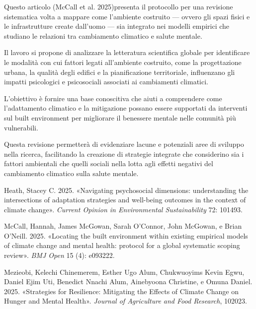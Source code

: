 \documentclass[
]{article}
\newlength{\cslhangindent}
\newenvironment{CSLReferences}[2] %
 {\begin{list}{}{%
  \setlength{\itemindent}{0pt}
  \setlength{\leftmargin}{0pt}
  \setlength{\parsep}{0pt}
  \ifodd #1
   \setlength{\leftmargin}{\cslhangindent}
   \setlength{\itemindent}{-1\cslhangindent}
  \fi
  \setlength{\itemsep}{#2\baselineskip}}}
 {\end{list}}
\begin{document}
Questo articolo (McCall et al. 2025)presenta il protocollo per una
revisione sistematica volta a mappare come l'ambiente costruito ---
ovvero gli spazi fisici e le infrastrutture create dall'uomo --- sia
integrato nei modelli empirici che studiano le relazioni tra cambiamento
climatico e salute mentale.

Il lavoro si propone di analizzare la letteratura scientifica globale
per identificare le modalità con cui fattori legati all'ambiente
costruito, come la progettazione urbana, la qualità degli edifici e la
pianificazione territoriale, influenzano gli impatti psicologici e
psicosociali associati ai cambiamenti climatici.

L'obiettivo è fornire una base conoscitiva che aiuti a comprendere come
l'adattamento climatico e la mitigazione possano essere supportati da
interventi sul built environment per migliorare il benessere mentale
nelle comunità più vulnerabili.

Questa revisione permetterà di evidenziare lacune e potenziali aree di
sviluppo nella ricerca, facilitando la creazione di strategie integrate
che considerino sia i fattori ambientali che quelli sociali nella lotta
agli effetti negativi del cambiamento climatico sulla salute mentale.

\label{refs}
\begin{CSLReferences}{1}{0}
Heath, Stacey C. 2025. {«Navigating psychosocial dimensions:
understanding the intersections of adaptation strategies and well-being
outcomes in the context of climate change»}. \emph{Current Opinion in
Environmental Sustainability} 72: 101493.

McCall, Hannah, James McGowan, Sarah O'Connor, John McGowan, e Brian
O'Neill. 2025. {«Locating the built environment within existing
empirical models of climate change and mental health: protocol for a
global systematic scoping review»}. \emph{BMJ Open} 15 (4): e093222.

Mezieobi, Kelechi Chinemerem, Esther Ugo Alum, Chukwuoyims Kevin Egwu,
Daniel Ejim Uti, Benedict Nnachi Alum, Ainebyoona Christine, e Omuna
Daniel. 2025. {«Strategies for Resilience: Mitigating the Effects of
Climate Change on Hunger and Mental Health»}. \emph{Journal of
Agriculture and Food Research}, 102023.

\end{CSLReferences}
\end{document}
